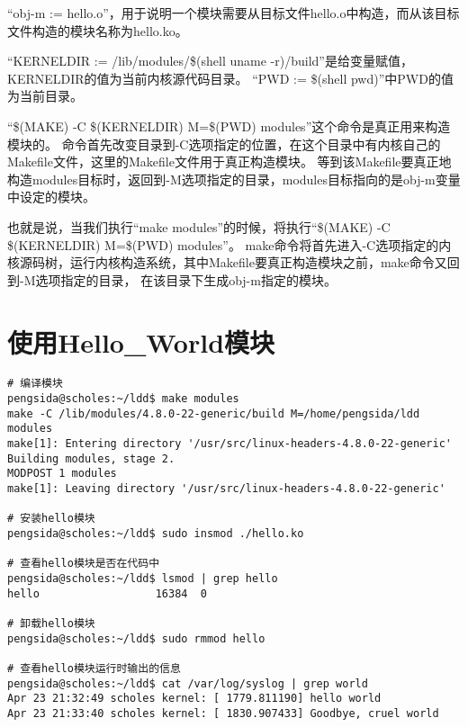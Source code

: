 \documentclass[a4paper,left=2.5cm,right=2.5cm,11pt]{article}
\begin{document}
	“obj-m := hello.o”，用于说明一个模块需要从目标文件hello.o中构造，而从该目标文件构造的模块名称为hello.ko。\par

	“KERNELDIR := /lib/modules/\$(shell uname -r)/build”是给变量赋值， KERNELDIR的值为当前内核源代码目录。
	“PWD := \$(shell pwd)”中PWD的值为当前目录。\par

	“\$(MAKE) -C \$(KERNELDIR) M=\$(PWD) modules”这个命令是真正用来构造模块的。
	命令首先改变目录到-C选项指定的位置，在这个目录中有内核自己的Makefile文件，这里的Makefile文件用于真正构造模块。
	等到该Makefile要真正地构造modules目标时，返回到-M选项指定的目录，modules目标指向的是obj-m变量中设定的模块。\par

	也就是说，当我们执行“make modules”的时候，将执行“\$(MAKE) -C \$(KERNELDIR) M=\$(PWD) modules”。
	make命令将首先进入-C选项指定的内核源码树，运行内核构造系统，其中Makefile要真正构造模块之前，make命令又回到-M选项指定的目录，
	在该目录下生成obj-m指定的模块。

\section{使用Hello\_World模块}
	\begin{lstlisting}
# 编译模块
pengsida@scholes:~/ldd$ make modules 
make -C /lib/modules/4.8.0-22-generic/build M=/home/pengsida/ldd modules
make[1]: Entering directory '/usr/src/linux-headers-4.8.0-22-generic'
Building modules, stage 2.
MODPOST 1 modules
make[1]: Leaving directory '/usr/src/linux-headers-4.8.0-22-generic'

# 安装hello模块
pengsida@scholes:~/ldd$ sudo insmod ./hello.ko

# 查看hello模块是否在代码中
pengsida@scholes:~/ldd$ lsmod | grep hello
hello                  16384  0

# 卸载hello模块
pengsida@scholes:~/ldd$ sudo rmmod hello

# 查看hello模块运行时输出的信息
pengsida@scholes:~/ldd$ cat /var/log/syslog | grep world
Apr 23 21:32:49 scholes kernel: [ 1779.811190] hello world
Apr 23 21:33:40 scholes kernel: [ 1830.907433] Goodbye, cruel world
	\end{lstlisting}
\end{document}
